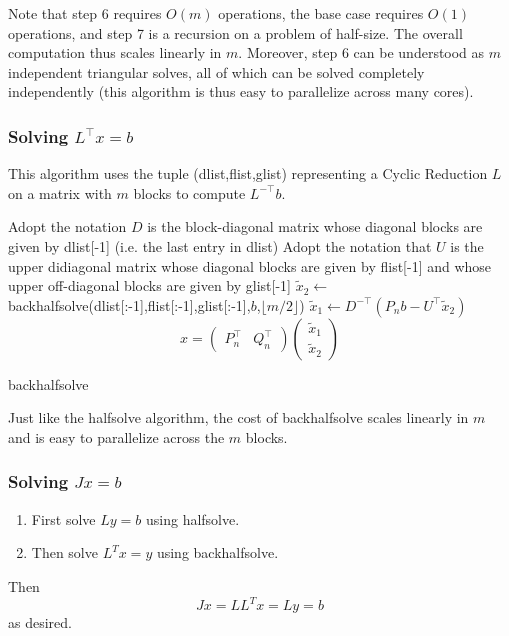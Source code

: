 \documentclass{article}
\theoremstyle{definition}
\begin{document}
Note that step 6 requires $O(m)$ operations, the base case requires $O(1)$ operations, and step 7 is a recursion on a problem of half-size.  The overall computation thus scales linearly in $m$.  Moreover, step 6 can be understood as $m$ independent triangular solves, all of which can be solved completely independently (this algorithm is thus easy to parallelize across many cores).  

\subsubsection{Solving $L^{\top}x=b$}

This algorithm uses the tuple (dlist,flist,glist) representing a Cyclic Reduction $L$  on a matrix with $m$ blocks to compute $L^{-\top}b$.

\begin{algorithm}[H]
 Adopt the notation $D$ is the block-diagonal matrix whose diagonal blocks are given by dlist[-1] (i.e. the last entry in dlist)\;
 Adopt the notation that $U$ is the upper didiagonal matrix whose diagonal blocks are given by flist[-1] and whose upper off-diagonal blocks are given by glist[-1]\;
 {
    $\tilde x_2 \gets$ backhalfsolve(dlist[:-1],flist[:-1],glist[:-1],$b$,$\lfloor m/2\rfloor$)\;
    $\tilde x_1 \gets D^{-\top} (P_n b- U^\top \tilde x_2)$\;
    \Return 
    \[
    x=\left(\begin{array}{cc}
    P_{n}^{\top} & Q_{n}^{\top}\end{array}\right)\left(\begin{array}{c}
    \tilde{x}_{1}\\
    \tilde{x}_{2}
    \end{array}\right)
    \]
 }
 \caption{backhalfsolve}
\end{algorithm}

Just like the halfsolve algorithm, the cost of backhalfsolve scales linearly in $m$ and is easy to parallelize across the $m$ blocks.

\subsubsection{Solving $Jx=b$}

\begin{enumerate}
\item First solve $Ly=b$ using halfsolve.
\item Then solve $L^{T}x=y$ using backhalfsolve.
\end{enumerate}
Then 
\[
Jx=LL^{T}x=Ly=b
\]
as desired.
\end{document}
